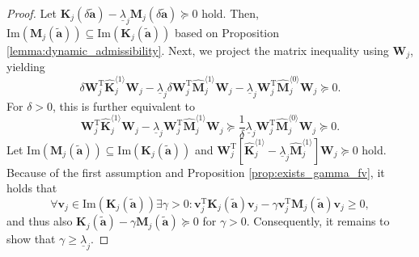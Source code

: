 \documentclass[10pt,a4paper]{amsart}
\begin{document}
\begin{proof}
\fbox{$\Rightarrow$} Let $\mathbf{K}_j(\delta \tilde{\mathbf{a}}) - \underline{\lambda}_j \mathbf{M}_j(\delta \tilde{\mathbf{a}}) \succeq 0$ hold. Then, $\mathrm{Im}\left(\mathbf{M}_j(\tilde{\mathbf{a}})\right) \subseteq \mathrm{Im}\left(\mathbf{K}_j(\tilde{\mathbf{a}})\right)$ based on Proposition \ref{lemma:dynamic_admissibility}. Next, we project the matrix inequality using $\mathbf{W}_j$, yielding
%
\begin{equation}
	\delta \mathbf{W}_{{j}}^\mathrm{T} \hat{\mathbf{K}}_j^{\langle 1\rangle} \mathbf{W}_j- \underline{\lambda}_j \delta \mathbf{W}_{{j}}^\mathrm{T} \hat{\mathbf{M}}_j^{\langle 1\rangle} \mathbf{W}_j - \underline{\lambda}_j\mathbf{W}_{{j}}^\mathrm{T} \hat{\mathbf{M}}_j^{\langle 0\rangle} \mathbf{W}_j \succeq 0.
\end{equation}
%
For $\delta>0$, this is further equivalent to
%
\begin{equation}
	\mathbf{W}_{{j}}^\mathrm{T} \hat{\mathbf{K}}_j^{\langle 1\rangle} \mathbf{W}_j- \underline{\lambda}_j \mathbf{W}_{{j}}^\mathrm{T} \hat{\mathbf{M}}_j^{\langle 1\rangle} \mathbf{W}_j \succeq \frac{1}{\delta}\underline{\lambda}_j\mathbf{W}_{{j}}^\mathrm{T} \hat{\mathbf{M}}_j^{\langle 0\rangle} \mathbf{W}_j \succeq 0.
\end{equation}
%
\fbox{$\Leftarrow$} Let $\mathrm{Im}\left(\mathbf{M}_j(\tilde{\mathbf{a}})\right) \subseteq \mathrm{Im}\left(\mathbf{K}_j(\tilde{\mathbf{a}})\right)$ and $\mathbf{W}_j^\mathrm{T}\left[\hat{\mathbf{K}}_{j}^{\langle 1\rangle} - \underline{\lambda}_j \hat{\mathbf{M}}_{j}^{\langle 1\rangle} \right]\mathbf{W}_j \succeq 0$ hold. Because of the first assumption and Proposition \ref{prop:exists_gamma_fv}, it holds that
%
\begin{equation}
\forall \mathbf{v}_j \in \mathrm{Im}\left(\mathbf{K}_j(\tilde{\mathbf{a}})\right) \exists \gamma>0: \mathbf{v}_j^\mathrm{T}\mathbf{K}_j(\tilde{\mathbf{a}})\mathbf{v}_j - \gamma\mathbf{v}_j^\mathrm{T}\mathbf{M}_j(\tilde{\mathbf{a}})\mathbf{v}_j \ge 0,
\end{equation}
%
and thus also $\mathbf{K}_j(\tilde{\mathbf{a}}) - \gamma\mathbf{M}_j(\tilde{\mathbf{a}}) \succeq 0$ for $\gamma > 0$. Consequently, it remains to show that $\gamma\ge \underline{\lambda}_j$.


\end{proof}
\end{document}
